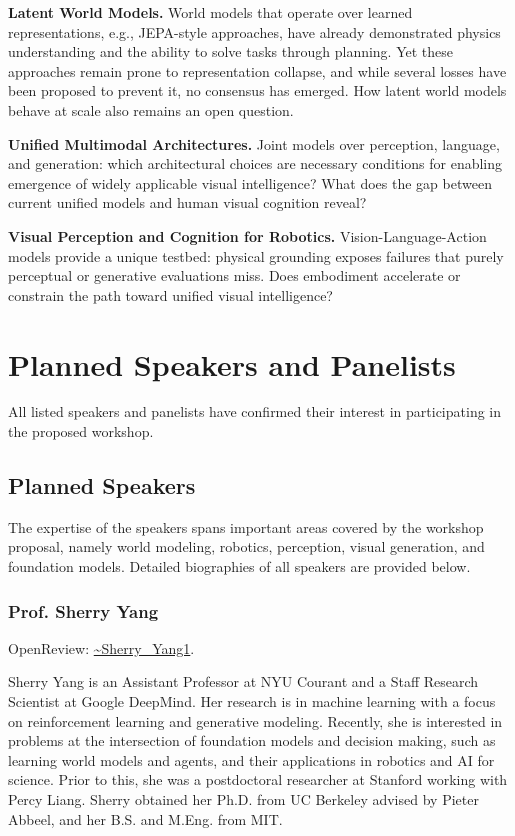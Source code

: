 \documentclass[11pt]{article}
\begin{document}
\textbf{Latent World Models.} World models that operate over learned representations, e.g., JEPA-style approaches, have already demonstrated physics understanding and the ability to solve tasks through planning. Yet these approaches remain prone to representation collapse, and while several losses have been proposed to prevent it, no consensus has emerged. How latent world models behave at scale also remains an open question.


\textbf{Unified Multimodal Architectures.} Joint models over perception, language, and generation: which architectural choices are necessary conditions for enabling emergence of widely applicable visual intelligence? What does the gap between current unified models and human visual cognition reveal?


\textbf{Visual Perception and Cognition for Robotics.} Vision-Language-Action models provide a unique testbed: physical grounding exposes failures that purely perceptual or generative evaluations miss. Does embodiment accelerate or constrain the path toward unified visual intelligence?


\section{Planned Speakers and Panelists}

All listed speakers and panelists have confirmed their interest in participating in the proposed workshop.


\subsection{Planned Speakers}

The expertise of the speakers spans important areas covered by the workshop proposal, namely world modeling, robotics, perception, visual generation, and foundation models. Detailed biographies of all speakers are provided below.


\subsubsection{Prof. Sherry Yang}

OpenReview: \href{https://openreview.net/profile?id=\string~Sherry\_Yang1}{\textasciitilde{}Sherry\_Yang1}.


Sherry Yang is an Assistant Professor at NYU Courant and a Staff Research Scientist at Google DeepMind. Her research is in machine learning with a focus on reinforcement learning and generative modeling. Recently, she is interested in problems at the intersection of foundation models and decision making, such as learning world models and agents, and their applications in robotics and AI for science. Prior to this, she was a postdoctoral researcher at Stanford working with Percy Liang. Sherry obtained her Ph.D. from UC Berkeley advised by Pieter Abbeel, and her B.S. and M.Eng. from MIT.
\end{document}

